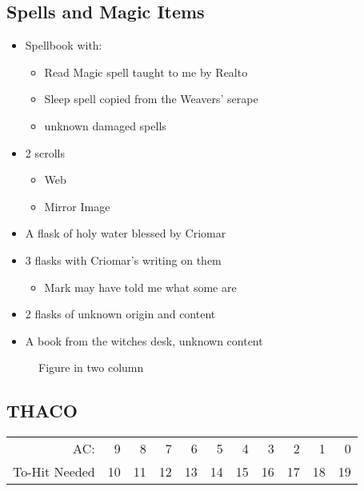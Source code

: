 \documentclass[a4paper]{article}
\begin{document}
\begin{multicols}{2}
\section{Spells and Magic Items}
\begin{itemize}[nosep, itemindent=1em, label=-]
  \item Spellbook with:
    \begin{itemize}[nosep, itemindent=1em, label=-]
    \item Read Magic spell taught to me by Realto
    \item Sleep spell copied from the Weavers' serape
    \item unknown damaged spells
  \end{itemize}
\item 2 scrolls
  \begin{itemize}[nosep, itemindent=1em, label=-]                                                   
    \item Web
    \item Mirror Image
  \end{itemize}
\item A flask of holy water blessed by Criomar
\item 3 flasks with Criomar's writing on them
  \begin{itemize}[nosep, itemindent=1em, label=-]
    \item Mark may have told me what some are
  \end{itemize}
\item 2 flasks of unknown origin and content
\item A book from the witches desk, unknown content
\end{itemize}

\begin{figure}[H]
  \centering
  \caption{Figure in two column}
\end{figure}
\end{multicols}

\begin{center}
\section{THACO}
\end{center}
\begin{table}[H]
\begin{center}
    \begin{tabular}{r|r|r|r|r|r|r|r|r|r|r} %
      AC: & 9 & 8 & 7 & 6 & 5 & 4 & 3 & 2 & 1 & 0\\
      To-Hit Needed & 10 & 11 & 12 & 13 & 14 & 15 & 16 & 17 & 18 & 19\\
    \end{tabular}
\end{center}
\end{table}
\end{document}
